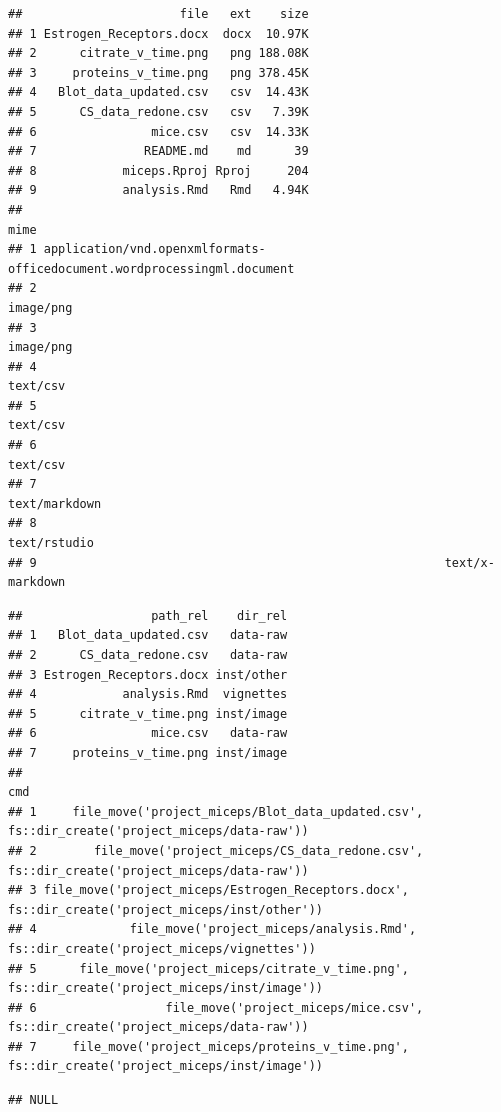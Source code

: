 \documentclass[APA,LATO1COL]{WileyNJD-v2}\usepackage[]{graphicx}\usepackage[]{color}
\makeatletter
\newenvironment{kframe}{%
 \def\at@end@of@kframe{}%
 \ifinner\ifhmode%
  \def\at@end@of@kframe{\end{minipage}}%
  \begin{minipage}{\columnwidth}%
 \fi\fi%
 \def\FrameCommand##1{\hskip\@totalleftmargin \hskip-\fboxsep
 \colorbox{shadecolor}{##1}\hskip-\fboxsep
     \hskip-\linewidth \hskip-\@totalleftmargin \hskip\columnwidth}%
 \MakeFramed {\advance\hsize-\width
   \@totalleftmargin\z@ \linewidth\hsize
   \@setminipage}}%
 {\par\unskip\endMakeFramed%
 \at@end@of@kframe}
\newenvironment{knitrout}{}{} %
\makeatother
\begin{document}
\begin{knitrout}
\begin{kframe}
{\ttfamily\noindent\itshape\color{messagecolor}{\#\# --\ \  Files present in directory ------------------------------ fertile 0.0.0.9027 --}}\begin{verbatim}
##                      file   ext    size
## 1 Estrogen_Receptors.docx  docx  10.97K
## 2      citrate_v_time.png   png 188.08K
## 3     proteins_v_time.png   png 378.45K
## 4   Blot_data_updated.csv   csv  14.43K
## 5      CS_data_redone.csv   csv   7.39K
## 6                mice.csv   csv  14.33K
## 7               README.md    md      39
## 8            miceps.Rproj Rproj     204
## 9            analysis.Rmd   Rmd   4.94K
##                                                                      mime
## 1 application/vnd.openxmlformats-officedocument.wordprocessingml.document
## 2                                                               image/png
## 3                                                               image/png
## 4                                                                text/csv
## 5                                                                text/csv
## 6                                                                text/csv
## 7                                                           text/markdown
## 8                                                            text/rstudio
## 9                                                         text/x-markdown
\end{verbatim}


{\ttfamily\noindent\itshape\color{messagecolor}{\#\# --\ \  Suggestions for moving files ---------------------------- fertile 0.0.0.9027 --}}\begin{verbatim}
##                  path_rel    dir_rel
## 1   Blot_data_updated.csv   data-raw
## 2      CS_data_redone.csv   data-raw
## 3 Estrogen_Receptors.docx inst/other
## 4            analysis.Rmd  vignettes
## 5      citrate_v_time.png inst/image
## 6                mice.csv   data-raw
## 7     proteins_v_time.png inst/image
##                                                                                                cmd
## 1     file_move('project_miceps/Blot_data_updated.csv', fs::dir_create('project_miceps/data-raw'))
## 2        file_move('project_miceps/CS_data_redone.csv', fs::dir_create('project_miceps/data-raw'))
## 3 file_move('project_miceps/Estrogen_Receptors.docx', fs::dir_create('project_miceps/inst/other'))
## 4             file_move('project_miceps/analysis.Rmd', fs::dir_create('project_miceps/vignettes'))
## 5      file_move('project_miceps/citrate_v_time.png', fs::dir_create('project_miceps/inst/image'))
## 6                  file_move('project_miceps/mice.csv', fs::dir_create('project_miceps/data-raw'))
## 7     file_move('project_miceps/proteins_v_time.png', fs::dir_create('project_miceps/inst/image'))
\end{verbatim}


{\ttfamily\noindent\itshape\color{messagecolor}{\#\# --\ \  Problematic paths logged -------------------------------- fertile 0.0.0.9027 --}}\begin{verbatim}
## NULL
\end{verbatim}
\end{kframe}
\end{knitrout}
\end{document}
